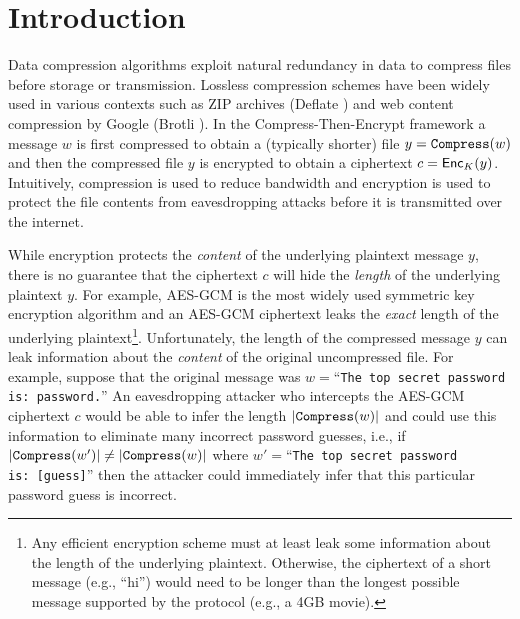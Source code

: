 \section{Introduction}
Data compression algorithms exploit natural redundancy in data to compress files before storage or transmission. Lossless compression schemes have been widely used in various contexts such as ZIP archives (Deflate \cite{rfc1951}) and web content compression by Google (Brotli \cite{rfc7932}). In the Compress-Then-Encrypt framework a message $w$ is first compressed to obtain a (typically shorter) file $y=\mathtt{Compress}(w)$ and then the compressed file $y$ is encrypted to obtain a ciphertext $c=\mathsf{Enc}_K(y)$. Intuitively, compression is used to reduce bandwidth and encryption is used to protect the file contents from eavesdropping attacks before it is transmitted over the internet.  

While encryption protects the {\em content} of the underlying plaintext message $y$, there is no guarantee that the ciphertext $c$ will hide the \emph{length} of the underlying plaintext $y$. For example, AES-GCM \cite{rfc5282} is the most widely used symmetric key encryption algorithm and an AES-GCM ciphertext leaks the {\em exact} length of the underlying plaintext\footnote{Any efficient encryption scheme must at least leak some information about the length of the underlying plaintext. Otherwise, the ciphertext of a short message (e.g., ``hi'') would need to be longer than the longest possible message supported by the protocol (e.g., a 4GB movie).}. Unfortunately, the length of the compressed message $y$ can leak information about the {\em content} of the original uncompressed file. For example, suppose that the original message was $w=$``\texttt{The top secret password is:~password.}'' An eavesdropping attacker who intercepts the AES-GCM ciphertext $c$ would be able to infer the length $\left|\mathtt{Compress}(w)\right|$ and could use this information to eliminate many incorrect password guesses, i.e.,  if $\left| \mathtt{Compress}(w')\right| \neq \left|\mathtt{Compress}(w)\right|$ where $w'=$``\texttt{The top secret password is:~[guess]}'' then the attacker could immediately infer that this particular password guess is incorrect. 

